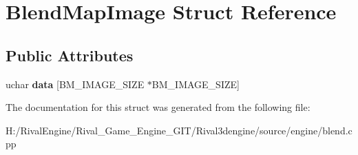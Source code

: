 \hypertarget{struct_blend_map_image}{}\section{Blend\+Map\+Image Struct Reference}
\label{struct_blend_map_image}
\subsection*{Public Attributes}
\begin{DoxyCompactItemize}
\item 
\mbox{\label{struct_blend_map_image_a1d29a6cb308d710af5a80c1942304367}} 
uchar {\bfseries data} \mbox{[}B\+M\+\_\+\+I\+M\+A\+G\+E\+\_\+\+S\+I\+ZE $\ast$B\+M\+\_\+\+I\+M\+A\+G\+E\+\_\+\+S\+I\+ZE\mbox{]}
\end{DoxyCompactItemize}


The documentation for this struct was generated from the following file\+:\begin{DoxyCompactItemize}
\item 
H\+:/\+Rival\+Engine/\+Rival\+\_\+\+Game\+\_\+\+Engine\+\_\+\+G\+I\+T/\+Rival3dengine/source/engine/blend.\+cpp\end{DoxyCompactItemize}
